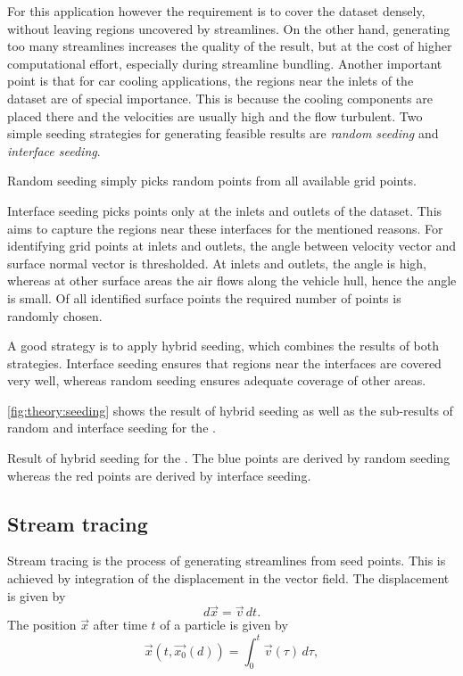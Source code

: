 For this application however the requirement is to cover the \threed dataset densely, without leaving regions uncovered by streamlines. On the other hand, generating too many streamlines increases the quality of the result, but at the cost of higher computational effort, especially during streamline bundling.
Another important point is that for car cooling applications, the regions near the inlets of the dataset are of special importance. This is because the cooling components are placed there and the velocities are usually high and the flow turbulent. Two simple seeding strategies for generating feasible results are \emph{random seeding} and \emph{interface seeding}.

Random seeding simply picks random points from all available grid points.

Interface seeding picks points only at the inlets and outlets of the dataset. This aims to capture the regions near these interfaces for the mentioned reasons. For identifying grid points at inlets and outlets, the angle between velocity vector and surface normal vector is thresholded. At inlets and outlets, the angle is high, whereas at other surface areas the air flows along the vehicle hull, hence the angle is small. Of all identified surface points the required number of points is randomly chosen.

A good strategy is to apply hybrid seeding, which combines the results of both strategies. Interface seeding ensures that regions near the interfaces are covered very well, whereas random seeding ensures adequate coverage of other areas.

\autoref{fig:theory:seeding} shows the result of hybrid seeding as well as the sub-results of random and interface seeding for the \toyotadataset.

{Result of hybrid seeding for the \toyotadataset. The blue points are derived by random seeding whereas the red points are derived by interface seeding.}


\subsection{Stream tracing}
\label{sec:theory:stream_tracing}

Stream tracing is the process of generating streamlines from seed points. This is achieved by integration of the displacement in the vector field. The displacement is given by~\cite{McLoughlin}
%
\begin{equation}
  d\vec{x} = \vec{v}\, dt.
\end{equation}
%
The position $\vec{x}$ after time $t$ of a particle is given by
\begin{equation}
  \vec{x}(t, \vec{x_0}(d)) = \int_0^t\vec{v}(\tau)\, d\tau,
\end{equation}

